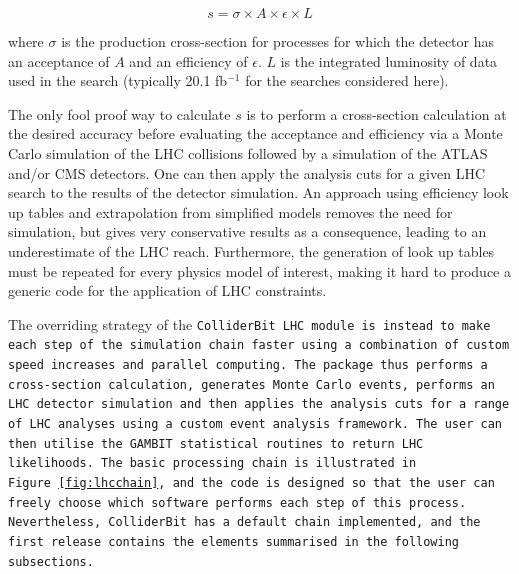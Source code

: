\begin{equation}
\label{eq:s}
s=\sigma \times A \times \epsilon \times L
\end{equation}

where $\sigma$ is the production cross-section for processes for which the detector has an acceptance of $A$ and an efficiency of $\epsilon$. $L$ is the integrated luminosity of data used in the search (typically 20.1 fb$^{-1}$ for the searches considered here).

The only fool proof way to calculate $s$ is to perform a cross-section calculation at the desired accuracy before evaluating the acceptance and efficiency via a Monte Carlo simulation of the LHC collisions followed by a simulation of the ATLAS and/or CMS detectors. One can then apply the analysis cuts for a given LHC search to the results of the detector simulation. An approach using efficiency look up tables and extrapolation from simplified models removes the need for simulation, but gives very conservative results as a consequence, leading to an underestimate of the LHC reach. Furthermore, the generation of look up tables must be repeated for every physics model of interest, making it hard to produce a generic code for the application of LHC constraints.

The overriding strategy of the \tt ColliderBit \rm LHC module is instead to make each step of the simulation chain faster using a combination of custom speed increases and parallel computing. The package thus performs a cross-section calculation, generates Monte Carlo events, performs an LHC detector simulation and then applies the analysis cuts for a range of LHC analyses using a custom event analysis framework. The user can then utilise the GAMBIT statistical routines to return LHC likelihoods. The basic processing chain is illustrated in Figure~\ref{fig:lhcchain}, and the code is designed so that the user can freely choose which software performs each step of this process. Nevertheless, \tt ColliderBit \rm has a default chain implemented, and the first release contains the elements summarised in the following subsections.

